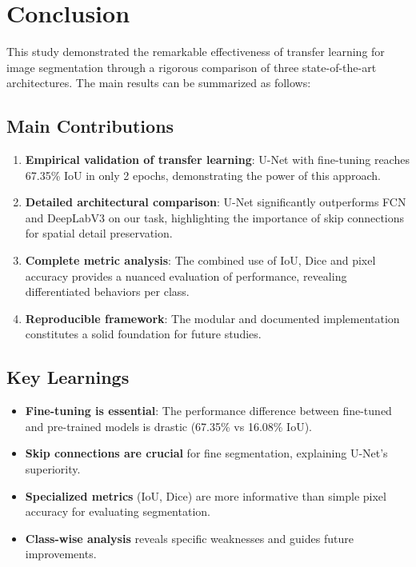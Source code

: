 \documentclass[12pt,a4paper]{article}
\begin{document}
\section{Conclusion}

This study demonstrated the remarkable effectiveness of transfer learning for image segmentation through a rigorous comparison of three state-of-the-art architectures. The main results can be summarized as follows:

\subsection{Main Contributions}

\begin{enumerate}
    \item \textbf{Empirical validation of transfer learning}: U-Net with fine-tuning reaches 67.35\% IoU in only 2 epochs, demonstrating the power of this approach.

    \item \textbf{Detailed architectural comparison}: U-Net significantly outperforms FCN and DeepLabV3 on our task, highlighting the importance of skip connections for spatial detail preservation.

    \item \textbf{Complete metric analysis}: The combined use of IoU, Dice and pixel accuracy provides a nuanced evaluation of performance, revealing differentiated behaviors per class.

    \item \textbf{Reproducible framework}: The modular and documented implementation constitutes a solid foundation for future studies.
\end{enumerate}

\subsection{Key Learnings}

\begin{itemize}
    \item \textbf{Fine-tuning is essential}: The performance difference between fine-tuned and pre-trained models is drastic (67.35\% vs 16.08\% IoU).
    \item \textbf{Skip connections are crucial} for fine segmentation, explaining U-Net's superiority.
    \item \textbf{Specialized metrics} (IoU, Dice) are more informative than simple pixel accuracy for evaluating segmentation.
    \item \textbf{Class-wise analysis} reveals specific weaknesses and guides future improvements.
\end{itemize}
\end{document}
